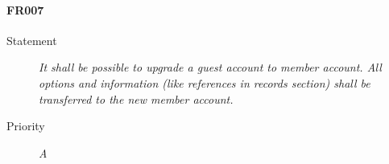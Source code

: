 \paragraph{FR007}
  \begin{description}
  \item [Statement] 
    \textit{ It shall be possible to upgrade a \gls{guest} account to \gls{member} account.
			All options and information (like references in records section) shall be transferred to the new \gls{member} account.}
  \item [Priority] \textit{A}
\end{description}